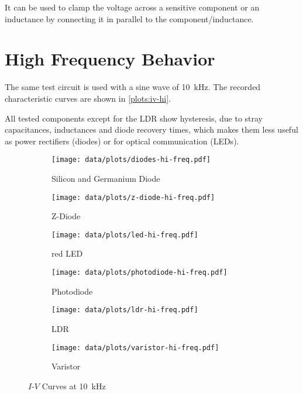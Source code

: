 It can be used to clamp the voltage across a sensitive component or an inductance by connecting it in parallel to the component/inductance.

\section{High Frequency Behavior}

The same test circuit is used with a sine wave of \SI{10}{\kHz}.
The recorded characteristic curves are shown in \autoref{plots:iv-hi}.

All tested components except for the LDR show hysteresis, due to stray capacitances, inductances and diode recovery times, which makes them less useful as power rectifiers (diodes) or for optical communication (LEDs).

\begin{figure}[tbp]
	\centering

	\begin{subfigure}{\ivsubfigwidth}
		\centering
		\texttt{[image: data/plots/diodes-hi-freq.pdf]}
		\caption{Silicon and Germanium Diode}
		\label{plot:iv-hi:si-ge-diode}
	\end{subfigure}
	\begin{subfigure}{\ivsubfigwidth}
		\centering
		\texttt{[image: data/plots/z-diode-hi-freq.pdf]}
		\caption{Z-Diode}
		\label{plot:iv-hi:z-diode}
	\end{subfigure}

	\begin{subfigure}{\ivsubfigwidth}
		\centering
		\texttt{[image: data/plots/led-hi-freq.pdf]}
		\caption{red LED}
		\label{plot:iv-hi:leds}
	\end{subfigure}
	\begin{subfigure}{\ivsubfigwidth}
		\centering
		\texttt{[image: data/plots/photodiode-hi-freq.pdf]}
		\caption{Photodiode}
		\label{plot:iv-hi:photodiode}
	\end{subfigure}

	\begin{subfigure}{\ivsubfigwidth}
		\centering
		\texttt{[image: data/plots/ldr-hi-freq.pdf]}
		\caption{LDR}
		\label{plot:iv-hi:ldr}
	\end{subfigure}
	\begin{subfigure}{\ivsubfigwidth}
		\centering
		\texttt{[image: data/plots/varistor-hi-freq.pdf]}
		\caption{Varistor}
		\label{plot:iv-hi:varistor}
	\end{subfigure}

	\caption{$I$-$V$ Curves at \SI{10}{\kHz}}
	\label{plots:iv-hi}
\end{figure}
